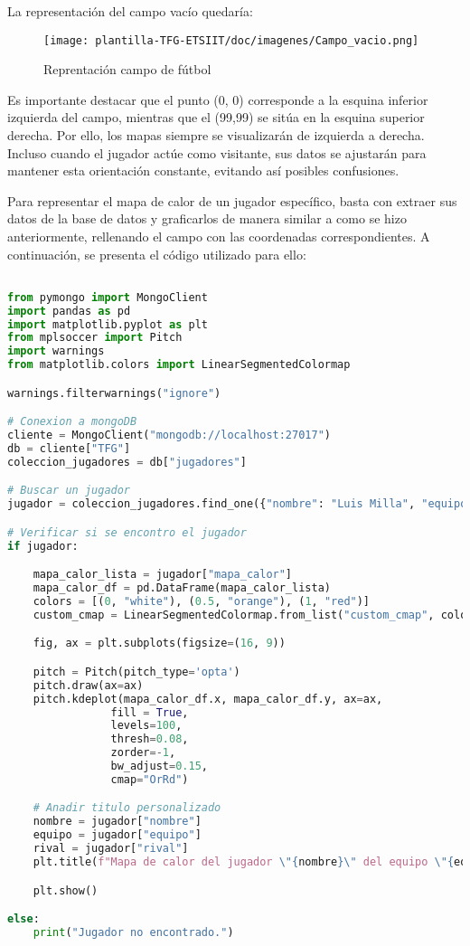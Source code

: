 La representación del campo vacío quedaría:

\begin{figure}[H]
    \centering
    \texttt{[image: plantilla-TFG-ETSIIT/doc/imagenes/Campo\_vacio.png]}
    \caption{Reprentación campo de fútbol}
    \label{fig:etiqueta-imagen}
\end{figure}

Es importante destacar que el punto (0, 0) corresponde a la esquina inferior izquierda del campo, mientras que el (99,99) se sitúa en la esquina superior derecha. Por ello, los mapas siempre se visualizarán de izquierda a derecha. Incluso cuando el jugador actúe como visitante, sus datos se ajustarán para mantener esta orientación constante, evitando así posibles confusiones.

Para representar el mapa de calor de un jugador específico, basta con extraer sus datos de la base de datos y graficarlos de manera similar a como se hizo anteriormente, rellenando el campo con las coordenadas correspondientes. A continuación, se presenta el código utilizado para ello:

\begin{lstlisting}[language=Python, caption={Mapa de calor de un futbolista}, label={lst:codigo-python}]

from pymongo import MongoClient
import pandas as pd
import matplotlib.pyplot as plt
from mplsoccer import Pitch
import warnings
from matplotlib.colors import LinearSegmentedColormap

warnings.filterwarnings("ignore")

# Conexion a mongoDB
cliente = MongoClient("mongodb://localhost:27017")
db = cliente["TFG"]
coleccion_jugadores = db["jugadores"]

# Buscar un jugador
jugador = coleccion_jugadores.find_one({"nombre": "Luis Milla", "equipo": "Getafe", "rival": "Villareal"})

# Verificar si se encontro el jugador
if jugador:

    mapa_calor_lista = jugador["mapa_calor"]
    mapa_calor_df = pd.DataFrame(mapa_calor_lista)
    colors = [(0, "white"), (0.5, "orange"), (1, "red")]
    custom_cmap = LinearSegmentedColormap.from_list("custom_cmap", colors)

    fig, ax = plt.subplots(figsize=(16, 9))

    pitch = Pitch(pitch_type='opta')
    pitch.draw(ax=ax)
    pitch.kdeplot(mapa_calor_df.x, mapa_calor_df.y, ax=ax,
                fill = True,
                levels=100,
                thresh=0.08,
                zorder=-1,
                bw_adjust=0.15,
                cmap="OrRd")

    # Anadir titulo personalizado
    nombre = jugador["nombre"]
    equipo = jugador["equipo"]
    rival = jugador["rival"]
    plt.title(f"Mapa de calor del jugador \"{nombre}\" del equipo \"{equipo}\", rival \"{rival}\"", fontsize=18)

    plt.show() 

else:
    print("Jugador no encontrado.")

\end{lstlisting}

